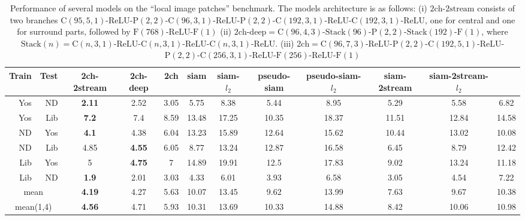 \documentclass[10pt,twocolumn,letterpaper]{article}
\begin{document}
\begin{table*}[t]
\footnotesize
\begin{center}
\begin{tabular}{rrcccccccccc}
\hline
    Train  &  Test     & 2ch-2stream & 2ch-deep  & 2ch   & siam & siam-$l_2$ & pseudo-siam & pseudo-siam-$l_2$ & siam-2stream & siam-2stream-$l_2$ & \cite{Simonyan14} \\ \hline
Yos   & ND    & \textbf{2.11} & 2.52 & 3.05  & 5.75  & 8.38  & 5.44  & 8.95  & 5.29 & 5.58 & 6.82 \\
Yos   & Lib   & \textbf{7.2} & 7.4 & 8.59  & 13.48 & 17.25 & 10.35 & 18.37 & 11.51 & 12.84 &14.58 \\
ND    & Yos   & \textbf{4.1} & 4.38 & 6.04  & 13.23 & 15.89 & 12.64 & 15.62 & 10.44 & 13.02 & 10.08 \\
ND    & Lib   & 4.85 & \textbf{4.55} & 6.05  & 8.77  & 13.24 & 12.87 & 16.58 & 6.45 & 8.79 & 12.42 \\
Lib   & Yos   & 5 & \textbf{4.75} & 7     & 14.89 & 19.91 & 12.5  & 17.83 & 9.02  & 13.24 & 11.18 \\
Lib   & ND    & \textbf{1.9} & 2.01 & 3.03  & 4.33  & 6.01  & 3.93  & 6.58  & 3.05 & 4.54 & 7.22 \\
\hline
\multicolumn{2}{c}{mean} & \textbf{4.19} & 4.27 & 5.63  & 10.07 & 13.45 & 9.62  & 13.99 & 7.63 & 9.67 & 10.38 \\
\hline
\multicolumn{2}{c}{mean(1,4)} & \textbf{4.56} & 4.71 & 5.93  & 10.31 & 13.69 & 10.33 & 14.88 & 8.42 & 10.06 & 10.98 \\
\hline
%
%
%
\end{tabular}
\end{center}
\footnotesize
\caption{Performance of several models on the ``local image patches'' benchmark.
%
 The models architecture  is as follows:
 (i) $2\mathrm{ch}$-$2\mathrm{stream}$ consists of two branches $\mathrm{C}(95,5,1)$-$\mathrm{ReLU}$-$\mathrm{P}(2,2)$-$\mathrm{C}(96,3,1)$-$\mathrm{ReLU}$-$\mathrm{P}(2,2)$-$\mathrm{C}(192,3,1)$-$\mathrm{ReLU}$-$\mathrm{C}(192,3,1)$-$\mathrm{ReLU}$, one for central and one for surround parts, followed by $\mathrm{F}(768)$-$\mathrm{ReLU}$-$\mathrm{F}(1)$
(ii) $2\mathrm{ch}$-$\mathrm{deep}=\mathrm{C}(96,4,3)$-$\mathrm{Stack}(96)$-$\mathrm{P}(2,2)$-$\mathrm{Stack}(192)$-$\mathrm{F}(1)$, where $\mathrm{Stack}(n)=\mathrm{C}(n,3,1)$-$\mathrm{ReLU}$-$\mathrm{C}(n,3,1)$-$\mathrm{ReLU}$-$\mathrm{C}(n,3,1)$-$\mathrm{ReLU}$.
(iii) $2\mathrm{ch}=\mathrm{C}(96,7,3)$-$\mathrm{ReLU}$-$\mathrm{P}(2,2)$-$\mathrm{C}(192,5,1)$-$\mathrm{ReLU}$-$\mathrm{P}(2,2)$-$\mathrm{C}(256,3,1)$-$\mathrm{ReLU}$-$\mathrm{F}(256)$-$\mathrm{ReLU}$-$\mathrm{F}(1)$
}
\end{table*}
\end{document}
